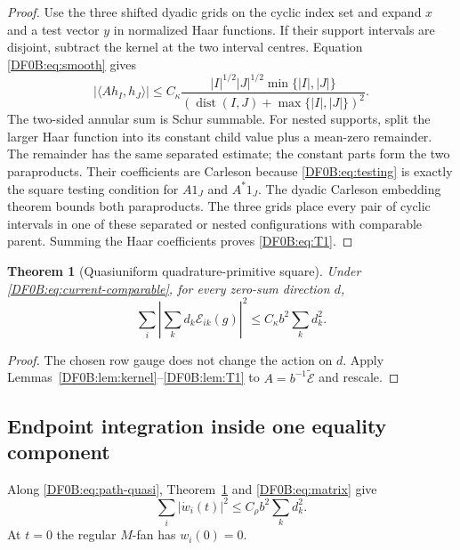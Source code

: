 \documentclass[11pt]{amsart}
\numberwithin{equation}{section}
\newtheorem{theorem}{Theorem}[section]
\theoremstyle{definition}
\theoremstyle{remark}
\begin{document}
\begin{proof}
Use the three shifted dyadic grids on the cyclic index set and expand
$x$ and a test vector $y$ in normalized Haar functions.  If their
support intervals are disjoint, subtract the kernel at the two interval
centres.  Equation \eqref{DF0B:eq:smooth} gives
\[
 |\langle Ah_I,h_J\rangle|
 \le C_\kappa
 \frac{|I|^{1/2}|J|^{1/2}\min\{|I|,|J|\}}
 {(\operatorname {dist}(I,J)+\max\{|I|,|J|\})^2}.
\]
The two-sided annular sum is Schur summable.  For nested supports, split
the larger Haar function into its constant child value plus a mean-zero
remainder.  The remainder has the same separated estimate; the constant
parts form the two paraproducts.  Their coefficients are Carleson because
\eqref{DF0B:eq:testing} is exactly the square testing condition for $A1_J$
and $A^*1_J$.  The dyadic Carleson embedding theorem bounds both
paraproducts.  The three grids place every pair of cyclic intervals in
one of these separated or nested configurations with comparable parent.
Summing the Haar coefficients proves \eqref{DF0B:eq:T1}.
\end{proof}

\begin{theorem}[Quasiuniform quadrature-primitive square]
\label{DF0B:thm:QPS}
Under \eqref{DF0B:eq:current-comparable}, for every zero-sum direction $d$,
\begin{equation}\label{DF0B:eq:QPS}
 \boxed{
 \sum_i\left|\sum_kd_k\mathcal E_{ik}(g)\right|^2
 \le C_\kappa b^2\sum_kd_k^2.}
\end{equation}
\end{theorem}

\begin{proof}
The chosen row gauge does not change the action on $d$.  Apply
Lemmas~\ref{DF0B:lem:kernel}--\ref{DF0B:lem:T1} to
$A=b^{-1}\widetilde{\mathcal E}$ and rescale.
\end{proof}

\subsection{Endpoint integration inside one equality component}

Along \eqref{DF0B:eq:path-quasi}, Theorem~\ref{DF0B:thm:QPS} and
\eqref{DF0B:eq:matrix} give
\begin{equation}\label{DF0B:eq:material-L2}
 \sum_i|\dot w_i(t)|^2\le C_\rho b^2\sum_kd_k^2.
\end{equation}
At $t=0$ the regular $M$-fan has $w_i(0)=0$.
\end{document}
